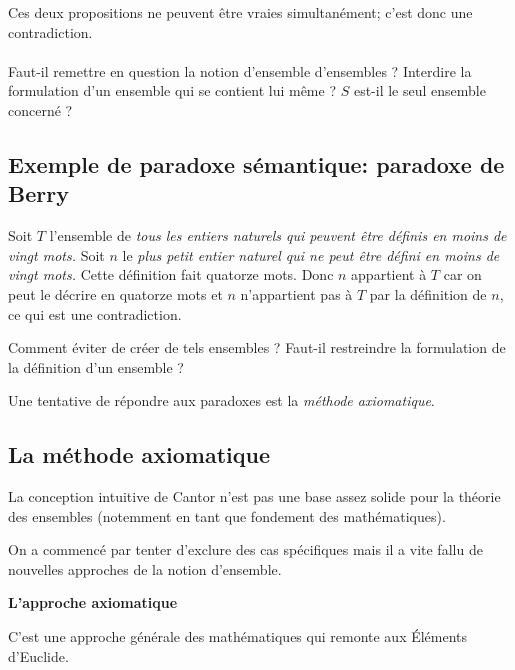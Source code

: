 \documentclass[fleqn,a4paper,nobib]{tufte-handout}
\begin{document}
Ces deux propositions ne peuvent être vraies simultanément; c'est donc une
contradiction. \\
\hspace{1pt} \\
Faut-il remettre en question la notion d'ensemble d'ensembles ?
Interdire la formulation d'un ensemble qui se contient lui même ?
$S$ est-il le seul ensemble concerné ?

\subsection*{Exemple de paradoxe sémantique: paradoxe de Berry
}

Soit $T$ l'ensemble de \textit{tous les entiers naturels qui peuvent
être définis en moins de vingt mots.} Soit $n$
le \textit{plus petit entier naturel qui ne peut être défini en moins de vingt mots.}
Cette définition fait quatorze mots. Donc $n$ appartient à $T$ car on peut le décrire
en quatorze mots et $n$ n'appartient pas à $T$ par la définition de $n$, ce qui est
une contradiction.

Comment éviter de créer de tels ensembles ? Faut-il restreindre la
formulation de la définition d'un ensemble ?

Une tentative de répondre aux paradoxes est la \textit{méthode axiomatique}.

\subsection{La méthode axiomatique}

La conception intuitive de Cantor n'est pas une base assez solide
pour la théorie des ensembles (notemment en tant que fondement des
mathématiques).

On a commencé par tenter d'exclure des cas spécifiques
 mais il a
vite fallu de nouvelles approches de la notion d'ensemble.

\textbf{L'approche axiomatique} 

C'est une approche générale des mathématiques qui remonte aux
Éléments d'Euclide.
\end{document}
